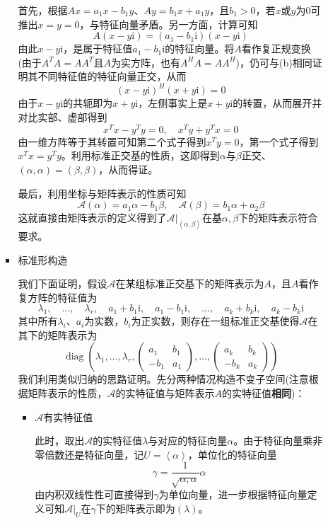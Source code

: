 \documentclass[a4paper,UTF8,fontset=windows,AutoFakeBold]{ctexart}
\DeclareMathOperator{\diag}{diag}
\newcommand*{\ir}{\mathrm{i}}
\newcommand*{\ma}{\mathcal{A}}
\begin{document}
\begin{enumerate}
\begin{enumerate}
\begin{itemize}
{                首先，根据$Ax=a_1x-b_1y$、$Ay=b_1x+a_1y$，且$b_1>0$，若$x$或$y$为0可推出$x=y=0$，与特征向量矛盾。另一方面，计算可知
                $$A(x-y\ir)=(a_1-b_1\ir)(x-y\ir)$$
                由此$x-y\ir$，是属于特征值$a_1-b_1\ir$的特征向量。将$A$看作复正规变换(由于$A^TA=AA^T$且$A$为实方阵，也有$A^HA=AA^H$)，仍可与(b)相同证明其不同特征值的特征向量正交，从而
                $$(x-y\ir)^H(x+y\ir)=0$$
                由于$x-y\ir$的共轭即为$x+y\ir$，左侧事实上是$x+y\ir$的转置，从而展开并对比实部、虚部得到
                $$x^Tx-y^Ty=0,\quad x^Ty+y^Tx=0$$
                由一维方阵等于其转置可知第二个式子得到$x^Ty=0$，第一个式子得到$x^Tx=y^Ty$。利用标准正交基的性质，这即得到$\alpha$与$\beta$正交、$(\alpha,\alpha)=(\beta,\beta)$，从而得证。

                最后，利用坐标与矩阵表示的性质可知
                $$\ma(\alpha)=a_1\alpha-b_1\beta,\quad\ma(\beta)=b_1\alpha+a_2\beta$$
                这就直接由矩阵表示的定义得到了$\ma|_{\left<\alpha,\beta\right>}$在基$\alpha,\beta$下的矩阵表示符合要求。
            }
            
            \item 标准形构造
            
            我们下面证明，假设$\ma$在某组标准正交基下的矩阵表示为$A$，且$A$看作复方阵的特征值为
            $$\lambda_1,\quad\dots,\quad\lambda_r,\quad a_1+b_1\ir,\quad a_1-b_1\ir,\quad\dots,\quad a_k+b_k\ir,\quad a_k-b_k\ir$$
            其中所有$\lambda_i$、$a_i$为实数，$b_i$为正实数，则存在一组标准正交基使得$\ma$在其下的矩阵表示为
            $$\diag\left(\lambda_1,\dots,\lambda_r,\begin{pmatrix}a_1&b_1\\-b_1&a_1\end{pmatrix},\dots,\begin{pmatrix}a_k&b_k\\-b_k&a_k\end{pmatrix}\right)$$
            我们利用类似归纳的思路证明。先分两种情况构造不变子空间(注意根据矩阵表示的性质，$\ma$的实特征值与矩阵表示$A$的实特征值\textbf{相同})：
            \begin{itemize}
                \item $\ma$有实特征值
                
                此时，取出$\ma$的实特征值$\lambda$与对应的特征向量$\alpha$。由于特征向量乘非零倍数还是特征向量，记$U=\left<\alpha\right>$，单位化的特征向量
                $$\gamma=\frac{1}{\sqrt{\alpha,\alpha}}\alpha$$
                由内积双线性性可直接得到$\gamma$为单位向量，进一步根据特征向量定义可知$\ma|_U$在$\gamma$下的矩阵表示即为$(\lambda)$。


\end{itemize}
\end{itemize}
\end{enumerate}
\end{enumerate}
\end{document}
